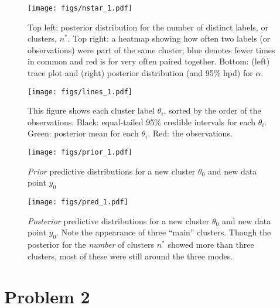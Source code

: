 \documentclass[12pt]{article}
\begin{document}
\begin{figure}[H]
\begin{center}
\texttt{[image: figs/nstar\_1.pdf]}
\caption{Top left: posterior distribution for the number of distinct labels, or clusters, $n^*$. Top right: a heatmap showing how often two labels (or observations) were part of the same cluster; blue denotes fewer times in common and red is for very often paired together. Bottom: (left) trace plot and (right) posterior distribution (and 95\% hpd) for $\alpha$.}
\end{center}
\end{figure}

\begin{figure}[H]
\begin{center}
\texttt{[image: figs/lines\_1.pdf]}
\caption{This figure shows each cluster label $\theta_i$, sorted by the order of the observations. Black: equal-tailed 95\% credible intervals for each $\theta_i$. Green: posterior mean for each $\theta_i$. Red: the observations.}
\end{center}
\end{figure}

\begin{figure}[H]
\begin{center}
\texttt{[image: figs/prior\_1.pdf]}
\caption{\emph{Prior} predictive distributions for a new cluster $\theta_0$ and new data point $y_0$}
\end{center}
\end{figure}

\begin{figure}[H]
\begin{center}
\texttt{[image: figs/pred\_1.pdf]}
\caption{\emph{Posterior} predictive distributions for a new cluster $\theta_0$ and new data point $y_0$. Note the appearance of three ``main'' clusters. Though the posterior for the \emph{number} of clusters $n^*$ showed more than three clusters, most of these were still around the three modes.}
\end{center}
\end{figure}


\newpage

\section*{Problem 2}





\end{document}
